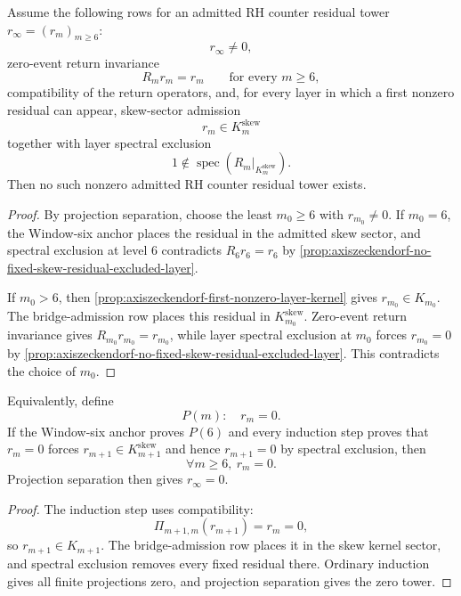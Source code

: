 \begin{theorem}
\label{thm:axiszeckendorf-layer-kernel-residual-refutation}
Assume the following rows for an admitted RH counter residual tower
$r_\infty=(r_m)_{m\geq6}$:
$$
r_\infty\neq0,
$$
zero-event return invariance
$$
R_mr_m=r_m
\qquad
\text{for every }m\geq6,
$$
compatibility of the return operators, and, for every layer in which a
first nonzero residual can appear, skew-sector admission
$$
r_m\in K_m^{\mathrm{skew}}
$$
together with layer spectral exclusion
$$
1\notin\operatorname{spec}(R_m|_{K_m^{\mathrm{skew}}}).
$$
Then no such nonzero admitted RH counter residual tower exists.
\end{theorem}

\begin{proof}
By projection separation, choose the least $m_0\geq6$ with
$r_{m_0}\neq0$.  If $m_0=6$, the Window-six anchor places the residual in
the admitted skew sector, and spectral exclusion at level $6$ contradicts
$R_6r_6=r_6$ by
\autoref{prop:axiszeckendorf-no-fixed-skew-residual-excluded-layer}.

If $m_0>6$, then
\autoref{prop:axiszeckendorf-first-nonzero-layer-kernel} gives
$r_{m_0}\in K_{m_0}$.  The bridge-admission row places this residual in
$K_{m_0}^{\mathrm{skew}}$.  Zero-event return invariance gives
$R_{m_0}r_{m_0}=r_{m_0}$, while layer spectral exclusion at $m_0$ forces
$r_{m_0}=0$ by
\autoref{prop:axiszeckendorf-no-fixed-skew-residual-excluded-layer}.  This
contradicts the choice of $m_0$.
\end{proof}

\begin{corollary}
\label{cor:axiszeckendorf-projection-induction-form}
Equivalently, define
$$
P(m):\quad r_m=0.
$$
If the Window-six anchor proves $P(6)$ and every induction step proves that
$r_m=0$ forces $r_{m+1}\in K_{m+1}^{\mathrm{skew}}$ and hence
$r_{m+1}=0$ by spectral exclusion, then
$$
\forall m\geq6,\ r_m=0.
$$
Projection separation then gives $r_\infty=0$.
\end{corollary}

\begin{proof}
The induction step uses compatibility:
$$
\Pi_{m+1,m}(r_{m+1})=r_m=0,
$$
so $r_{m+1}\in K_{m+1}$.  The bridge-admission row places it in the skew
kernel sector, and spectral exclusion removes every fixed residual there.
Ordinary induction gives all finite projections zero, and projection
separation gives the zero tower.
\end{proof}

